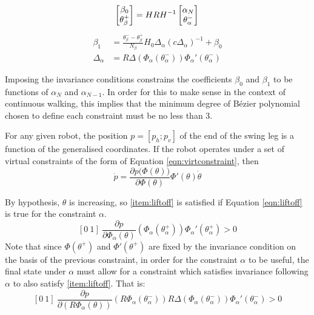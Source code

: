 \begin{equation} \label{eqn:bezinvconfig}
	\begin{bmatrix}
	 \beta_0 \\ \theta_\beta^+
	\end{bmatrix}
	= HRH^{-1} \begin{bmatrix}
		\alpha_N \\ \theta_\alpha^-
	\end{bmatrix} \\
\end{equation}
\begin{subequations} \label{eqn:bezinvvel}
\begin{align}
	\beta_1 &= \frac{\theta_\beta^- - \theta_\beta^+}{N_\beta}
	H_0\Delta_\alpha \left(c\Delta_\alpha\right)^{-1} + \beta_0\\
	\Delta_\alpha &= R\Delta\left(\Phi_\alpha\left(\theta_\alpha^-\right)\right)
		\Phi_\alpha'\left(\theta_\alpha^-\right) \label{eqn:Delthd}
\end{align}
\end{subequations}

Imposing the invariance conditions constrains the coefficients $\beta_0$ and $\beta_1$ to be functions of $\alpha_N$ and $\alpha_{N-1}$. In order for this to make sense in the context of continuous walking, this implies that the minimum degree of Bézier polynomial chosen to define each constraint must be no less than 3.

For any given robot, the position $p=[p_h;p_v]$ of the end of the swing leg is a function of the generalised coordinates. If the robot operates under a set of virtual constraints of the form of Equation \ref{eqn:virtconstraint}, then %
\begin{equation*}
	\dot{p} = \frac{\partial p\Big(\Phi(\theta)\Big)}{\partial\Phi(\theta)}
	\Phi'(\theta)\dot{\theta}
\end{equation*}

By hypothesis, $\theta$ is increasing, so \ref{item:liftoff} is satisfied if Equation \ref{eqn:liftoff} is true for the constraint $\alpha$.
\begin{equation} \label{eqn:liftoff}
	[0~1]~\frac{\partial p}{\partial\Phi_\alpha(\theta)}
	\left(\Phi_\alpha\left(\theta_\alpha^+\right)\right)\Phi_\alpha'\left(\theta_\alpha^+\right)>0
\end{equation}
Note that since $\Phi\left(\theta^+\right)$ and $\Phi'\left(\theta^+\right)$ are fixed by the invariance condition on the basis of the previous constraint, in order for the constraint $\alpha$ to be useful, the final state under $\alpha$ must allow for a constraint which satisfies invariance following $\alpha$ to also satisfy \ref{item:liftoff}. That is:
\begin{equation} \label{eqn:liftoffNext}
	[0~1]~\frac{\partial p}{\partial\left(R\Phi_\alpha(\theta)\right)}
	\left(R\Phi_\alpha\left(\theta_\alpha^-\right)\right)
	R\Delta\left(\Phi_\alpha\left(\theta_\alpha^-\right)\right)
	\Phi_\alpha'\left(\theta_\alpha^-\right)>0
\end{equation}

